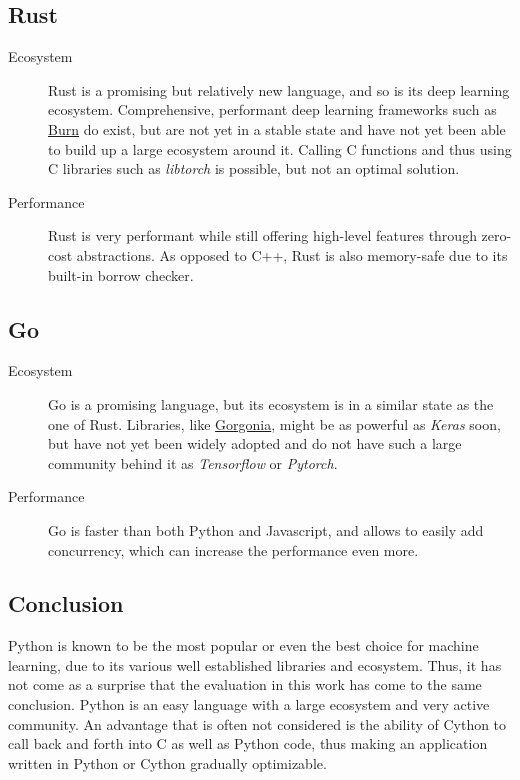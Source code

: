 \documentclass[12pt, a4paper, titlepage]{report}
\begin{document}
{
   \center
   \subsection*{Rust}
}
\begin{description}
   \item[Ecosystem] Rust is a promising but relatively new language, and so is its deep learning ecosystem. Comprehensive, performant deep learning frameworks such as \href{https://github.com/Tracel-AI/burn}{Burn} do exist, but are not yet in a stable state and have not yet been able to build up a large ecosystem around it. Calling C functions and thus using C libraries such as \emph{libtorch} is possible, but not an optimal solution.
   \item[Performance] Rust is very performant while still offering high-level features through zero-cost abstractions. As opposed to C++, Rust is also memory-safe due to its built-in borrow checker.
\end{description}

{
   \center
   \subsection*{Go}
}
\begin{description}
   \item[Ecosystem] Go is a promising language, but its ecosystem is in a similar state as the one of Rust. Libraries, like \href{https://github.com/Tracel-AI/gorgonia}{Gorgonia}, might be as powerful as \emph{Keras} soon, but have not yet been widely adopted and do not have such a large community behind it as \emph{Tensorflow} or \emph{Pytorch}.
   \item[Performance] Go is faster than both Python and Javascript, and allows to easily add concurrency, which can increase the performance even more.
\end{description}


\subsection{Conclusion}

Python is known to be the most popular or even the best choice for machine learning, due to its various well established libraries and ecosystem. Thus, it has not come as a surprise that the evaluation in this work has come to the same conclusion. Python is an easy language with a large ecosystem and very active community. An advantage that is often not considered is the ability of Cython to call back and forth into C as well as Python code, thus making an application written in Python or Cython gradually optimizable.
\end{document}
